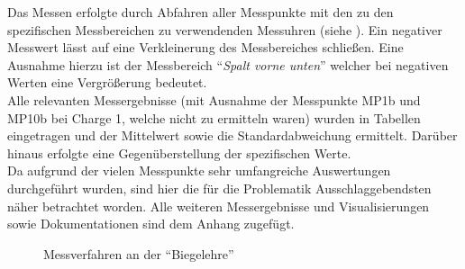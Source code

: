 \documentclass[12pt,a4paper,parskip]{scrartcl}
\begin{document}
{ 
Das Messen erfolgte durch Abfahren aller Messpunkte mit den zu den spezifischen Messbereichen zu verwendenden Messuhren (siehe ). Ein negativer Messwert lässt auf eine Verkleinerung des Messbereiches schließen. Eine Ausnahme hierzu ist der Messbereich "`\emph{Spalt vorne unten}"' welcher  bei negativen Werten eine Vergrößerung bedeutet.\\
 Alle relevanten Messergebnisse (mit Ausnahme der Messpunkte MP1b und MP10b bei Charge 1, welche nicht zu ermitteln waren) wurden in Tabellen eingetragen und  der Mittelwert sowie die Standardabweichung
 ermittelt. Darüber hinaus erfolgte eine Gegenüberstellung der spezifischen Werte.\\
Da aufgrund der vielen Messpunkte  sehr umfangreiche Auswertungen durchgeführt wurden,  sind hier die für die Problematik Ausschlaggebendsten näher betrachtet worden. Alle weiteren Messergebnisse und Visualisierungen sowie Dokumentationen sind dem Anhang zugefügt. 
\begin{figure}[!htb]
\centering
\hfill
{}
\hfill
{}
\hfill
\caption{Messverfahren an der "`Biegelehre"' }
\label{fig:messverfahren}
\end{figure}


}
\end{document}

